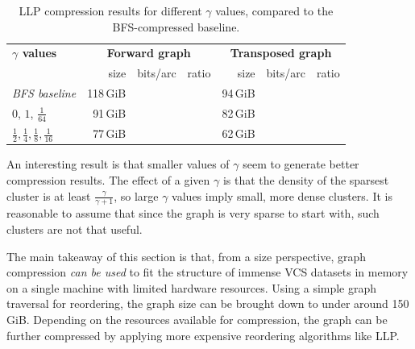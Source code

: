 \begin{table}
  \centering
  \caption{LLP compression results for different $\gamma$ values, compared to
    the BFS-compressed baseline.}%
  \label{tab:compression-llp-gammas}

  \renewcommand{\arraystretch}{1.5}
  \begin{tabular}{l r r r r r r}
      \hline \textbf{$\gamma$ values} \hspace{4em}
      & \multicolumn{3}{c}{\textbf{Forward graph}}
      & \multicolumn{3}{c}{\textbf{Transposed graph}} \\

      & size & bits/arc & ratio
      & size & bits/arc & ratio \\

      \hline \emph{BFS baseline}
      & 118\,GiB & \TODO{} & \TODO{}
      & 94\,GiB & \TODO{} & \TODO{} \\

      \hline $0$, $1$, $\frac{1}{64}$
      & 91\,GiB & \TODO{} & \TODO{}
      & 82\,GiB & \TODO{} & \TODO{} \\

      \hline $\frac{1}{2}, \frac{1}{4}, \frac{1}{8}, \frac{1}{16}$
      & 77\,GiB & \TODO{} & \TODO{}
      & 62\,GiB & \TODO{} & \TODO{} \\
    \hline
  \end{tabular}
\end{table}


An interesting result is that smaller values of $\gamma$ seem to generate
better compression results.
The effect of a given $\gamma$ is that the density of the sparsest cluster is
at least $\frac{\gamma}{\gamma+1}$, so large $\gamma$ values imply small, more
dense clusters.  It is reasonable to assume that since the graph is very sparse
to start with, such clusters are not that useful.

\bigskip

The main takeaway of this section is that, from a size perspective, graph
compression \emph{can be used} to fit the structure of immense VCS datasets in
memory on a single machine with limited hardware resources. Using a simple
graph traversal for reordering, the graph size can be brought down to under
around 150 GiB. Depending on the resources available for compression, the
graph can be further compressed by applying more expensive reordering
algorithms like \gls{LLP}.


